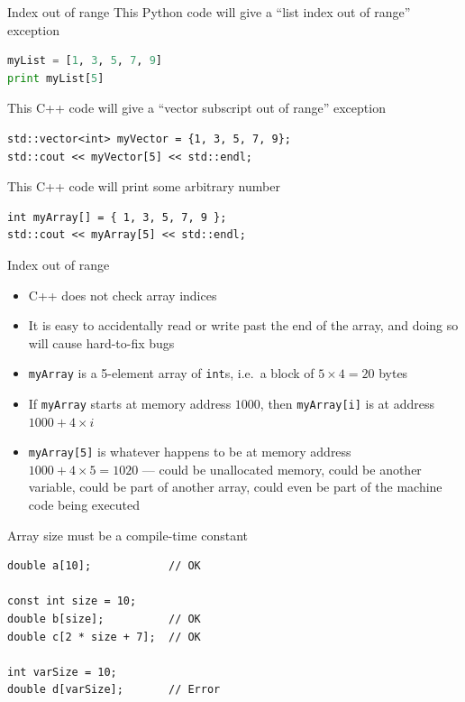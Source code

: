 \begin{frame}[fragile]{Index out of range}
    This Python code will give a ``list index out of range'' exception
    \begin{lstlisting}[language=Python]
myList = [1, 3, 5, 7, 9]
print myList[5]
    \end{lstlisting}
    \pause
    
    This C++ code will give a ``vector subscript out of range'' exception
    \begin{lstlisting}
std::vector<int> myVector = {1, 3, 5, 7, 9};
std::cout << myVector[5] << std::endl;
    \end{lstlisting}
    \pause
    
    This C++ code will print some arbitrary number
    \begin{lstlisting}
int myArray[] = { 1, 3, 5, 7, 9 };
std::cout << myArray[5] << std::endl;
    \end{lstlisting}
\end{frame}

\begin{frame}[fragile]{Index out of range}
    \begin{itemize}
        \item C++ does not check array indices \pause
        \item It is easy to accidentally read or write past the end of the array, and doing so will cause
            hard-to-fix bugs \pause
        \item \lstinline{myArray} is a 5-element array of \lstinline{int}s, i.e.\ a block of $5 \times 4 = 20$ bytes \pause
        \item If \lstinline{myArray} starts at memory address $1000$, then \lstinline{myArray[i]} is at address
            $1000 + 4 \times i$ \pause
        \item \lstinline{myArray[5]} is whatever happens to be at memory address $1000 + 4 \times 5 = 1020$ ---
            could be unallocated memory, could be another variable, could be part of another array,
            could even be part of the machine code being executed
    \end{itemize}
\end{frame}

\begin{frame}[fragile]{Array size must be a compile-time constant}
    \begin{lstlisting}
double a[10];            // OK

const int size = 10;
double b[size];          // OK
double c[2 * size + 7];  // OK

int varSize = 10;
double d[varSize];       // Error
    \end{lstlisting}
\end{frame}

